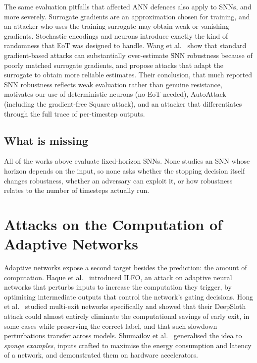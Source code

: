 The same evaluation pitfalls that affected ANN defences also apply to SNNs, and more severely. Surrogate gradients are an approximation chosen for training, and an attacker who uses the training surrogate may obtain weak or vanishing gradients. Stochastic encodings and neurons introduce exactly the kind of randomness that EoT was designed to handle. Wang et al.~\cite{wang2026towards} show that standard gradient-based attacks can substantially over-estimate SNN robustness because of poorly matched surrogate gradients, and propose attacks that adapt the surrogate to obtain more reliable estimates. Their conclusion, that much reported SNN robustness reflects weak evaluation rather than genuine resistance, motivates our use of deterministic neurons (no EoT needed), AutoAttack (including the gradient-free Square attack), and an attacker that differentiates through the full trace of per-timestep outputs.

\subsection{What is missing}

All of the works above evaluate fixed-horizon SNNs. None studies an SNN whose horizon depends on the input, so none asks whether the stopping decision itself changes robustness, whether an adversary can exploit it, or how robustness relates to the number of timesteps actually run.

\section{Attacks on the Computation of Adaptive Networks}
\label{sec:rw-energy-attacks}

Adaptive networks expose a second target besides the prediction: the amount of computation. Haque et al.~\cite{haque2020ilfo} introduced ILFO, an attack on adaptive neural networks that perturbs inputs to increase the computation they trigger, by optimising intermediate outputs that control the network's gating decisions. Hong et al.~\cite{hong2021panda} studied multi-exit networks specifically and showed that their DeepSloth attack could almost entirely eliminate the computational savings of early exit, in some cases while preserving the correct label, and that such slowdown perturbations transfer across models. Shumailov et al.~\cite{shumailov2021sponge} generalised the idea to \emph{sponge examples}, inputs crafted to maximise the energy consumption and latency of a network, and demonstrated them on hardware accelerators.

